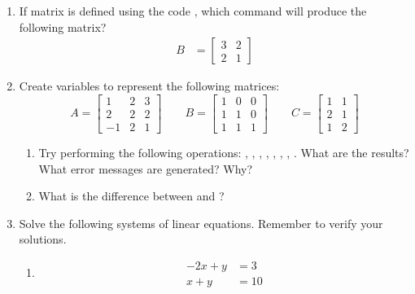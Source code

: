 {\begin{minipage}{\linewidth}
\begin{enumerate}
\item If matrix  is defined using the \mlab code , which command will produce the following matrix? 
\begin{align*}
B&=\left[ \begin{array}{cc} 3 & 2 \\ 2 & 1 \end{array} \right]
\end{align*}

\item Create variables to represent the following matrices:
\begin{equation*}
A=\left[ \begin{array}{ccc} 1 & 2 & 3 \\ 2 & 2 & 2 \\ -1 & 2 & 1 \end{array} \right] \qquad
B=\left[ \begin{array}{ccc} 1 & 0 & 0 \\ 1 & 1 & 0 \\ 1 & 1 & 1 \end{array} \right] \qquad
C=\left[ \begin{array}{cc} 1 & 1 \\ 2 & 1 \\ 1 & 2 \end{array} \right]
\end{equation*}
	\begin{enumerate}
	\item Try performing the following operations: , , , , , , , . What are the results? What error messages are generated? Why?
	\item What is the difference between  and ?
	\end{enumerate}

\item Solve the following systems of linear equations. Remember to verify your solutions.
\begin{enumerate}
\item \begin{equation*}
\begin{split}
-2x + y &= 3 \\
x + y &= 10
\end{split}
\end{equation*}
\end{enumerate}
\end{enumerate}
\end{minipage}%
}\\
\addtolength{\parindent}{4mm}

